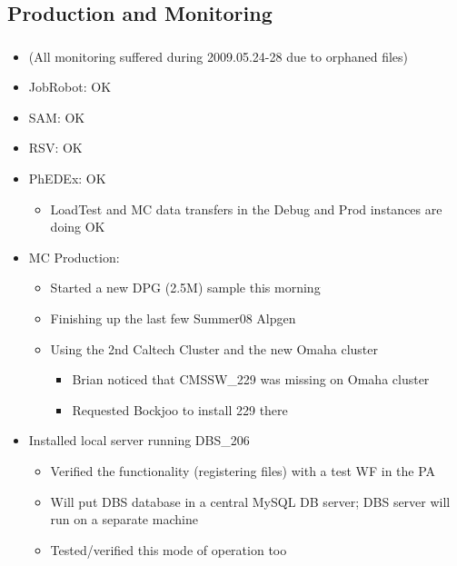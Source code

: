 \documentclass{beamer}
\begin{document}
\subsection{Production and Monitoring}
\begin{frame}
\frametitle{}
\begin{itemize}
	\item (All monitoring suffered during 2009.05.24-28 due to orphaned files)
	\item JobRobot: OK
	\item SAM: OK
	\item RSV: OK
	\item PhEDEx: OK
  \begin{itemize}
		\item LoadTest and MC data transfers in the Debug and Prod instances are doing OK
	\end{itemize}
	\item MC Production:
	\begin{itemize}
		\item Started a new DPG (2.5M) sample this morning
		\item Finishing up the last few Summer08 Alpgen
		\item Using the 2nd Caltech Cluster and the new Omaha cluster
		\begin{itemize}
			\item Brian noticed that CMSSW\_229 was missing on Omaha cluster
			\item Requested Bockjoo to install 229 there
		\end{itemize}
	\end{itemize}
	\item Installed local server running DBS\_206 
	\begin{itemize}
		\item Verified the functionality (registering files) with a test WF in the PA
		\item Will put DBS database in a central MySQL DB server;  DBS server will run on a separate machine
		\item Tested/verified this mode of operation too
	\end{itemize}
\end{itemize}
\end{frame}
\end{document}
